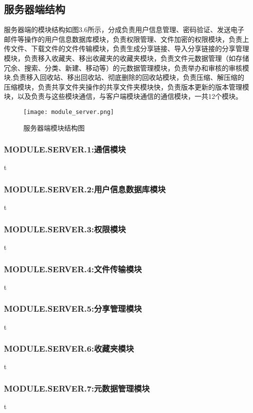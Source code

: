 \subsection{服务器端结构}
服务器端的模块结构如图3.6所示，分成负责用户信息管理、密码验证、发送电子邮件等操作的用户信息数据库模块，负责权限管理、文件加密的权限模块，负责上传文件、下载文件的文件传输模块，负责生成分享链接、导入分享链接的分享管理模块，负责移入收藏夹、移出收藏夹的收藏夹模块，负责文件元数据管理（如存储冗余、搜索、分类、新建、移动等）的元数据管理模块，负责举办和审核的审核模块,负责移入回收站、移出回收站、彻底删除的回收站模块，负责压缩、解压缩的压缩模块，负责共享文件夹操作的共享文件夹模块快，负责版本更新的版本管理模块，以及负责与这些模块通信，与客户端模块通信的通信模块，一共12个模块。

\begin{figure}[!h] 
\centering   
\texttt{[image: module\_server.png]}
\caption{服务器端模块结构图}\label{fig:noted-figure}
\end{figure}

\subsubsection{MODULE.SERVER.1:通信模块}
t

\subsubsection{MODULE.SERVER.2:用户信息数据库模块}
t

\subsubsection{MODULE.SERVER.3:权限模块}
t

\subsubsection{MODULE.SERVER.4:文件传输模块}
t

\subsubsection{MODULE.SERVER.5:分享管理模块}
t

\subsubsection{MODULE.SERVER.6:收藏夹模块}
t

\subsubsection{MODULE.SERVER.7:元数据管理模块}
t

